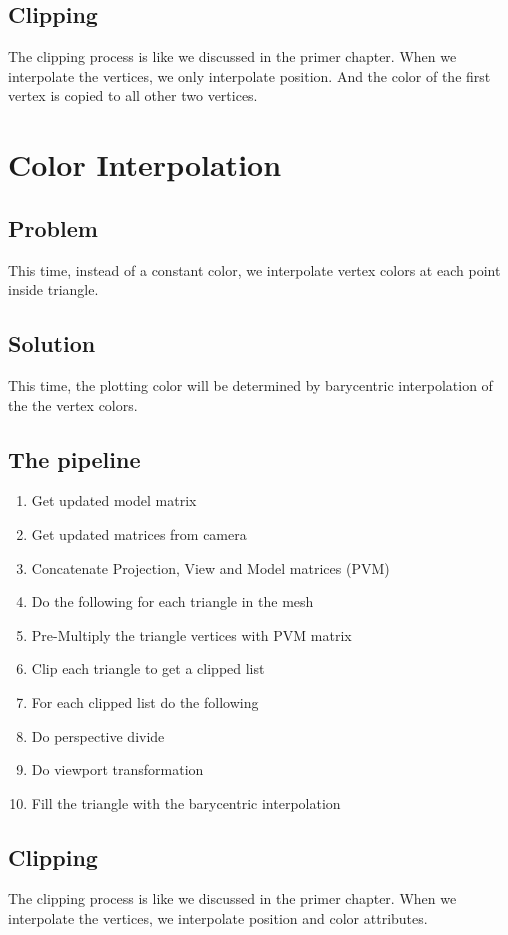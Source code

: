 \subsection{Clipping}
The clipping process is like we discussed in the primer chapter. When we interpolate the vertices, we only interpolate position. And the color of the first vertex is copied to all other two vertices.

\section{Color Interpolation}
\subsection{Problem}
This time, instead of a constant color, we interpolate vertex colors at each point inside triangle.
\subsection{Solution}
This time, the plotting color will be determined by barycentric interpolation of the the vertex colors. 
\subsection{The pipeline}
\begin{enumerate}
    \item Get updated model matrix
    \item Get updated matrices from camera
    \item Concatenate Projection, View and Model matrices (PVM)
    \item Do the following for each triangle in the mesh
    \item Pre-Multiply the triangle vertices with PVM matrix
    \item Clip each triangle to get a clipped list
    \item For each clipped list do the following
    \item Do perspective divide
    \item Do viewport transformation
    \item Fill the triangle with the barycentric interpolation
\end{enumerate}

\subsection{Clipping}
The clipping process is like we discussed in the primer chapter. When we interpolate the vertices,  we interpolate position and color attributes.

\clearpage 